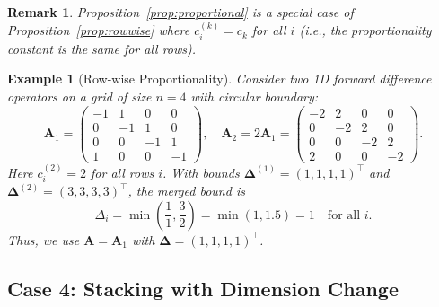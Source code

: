 \documentclass{article}
\newtheorem{example}{Example}
\newtheorem{remark}{Remark}
\begin{document}
\begin{remark}
Proposition~\ref{prop:proportional} is a special case of Proposition~\ref{prop:rowwise} where $c_i^{(k)} = c_k$ for all $i$ (i.e., the proportionality constant is the same for all rows).
\end{remark}

\begin{example}[Row-wise Proportionality]
Consider two 1D forward difference operators on a grid of size $n = 4$ with circular boundary:
\begin{equation}
    \mathbf{A}_1 = \begin{pmatrix} -1 & 1 & 0 & 0 \\ 0 & -1 & 1 & 0 \\ 0 & 0 & -1 & 1 \\ 1 & 0 & 0 & -1 \end{pmatrix}, \quad
    \mathbf{A}_2 = 2\mathbf{A}_1 = \begin{pmatrix} -2 & 2 & 0 & 0 \\ 0 & -2 & 2 & 0 \\ 0 & 0 & -2 & 2 \\ 2 & 0 & 0 & -2 \end{pmatrix}.
\end{equation}
Here $c_i^{(2)} = 2$ for all rows $i$. With bounds $\boldsymbol{\Delta}^{(1)} = (1, 1, 1, 1)^\top$ and $\boldsymbol{\Delta}^{(2)} = (3, 3, 3, 3)^\top$, the merged bound is
\begin{equation}
    \Delta_i = \min\left(\frac{1}{1}, \frac{3}{2}\right) = \min(1, 1.5) = 1 \quad \text{for all } i.
\end{equation}
Thus, we use $\mathbf{A} = \mathbf{A}_1$ with $\boldsymbol{\Delta} = (1, 1, 1, 1)^\top$.
\end{example}

\subsection{Case 4: Stacking with Dimension Change}
\end{document}
